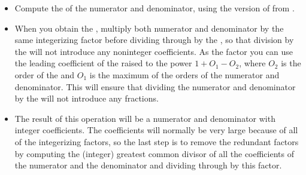 \begin{itemize}
\item
Compute the  of the numerator and denominator, using the version
of  from .

\item
When you obtain the , multiply both numerator and denominator by
the same integerizing factor before dividing through by the , so
that division by the  will not introduce any noninteger
coefficients.  As the factor you can use the leading coefficient of the
 raised to the power \( 1 + O_1 - O_2 \), where \( O_2 \) is the
order of the  and \( O_1 \) is the maximum of the orders of the
numerator and denominator.  This will ensure that dividing the numerator and
denominator by the  will not introduce any fractions.

\item
The result of this operation will be a numerator and denominator with integer
coefficients.  The coefficients will normally be very large because of all of
the integerizing factors, so the last step is to remove the redundant factors
by computing the (integer) greatest common divisor of all the coefficients of
the numerator and the denominator and dividing through by this factor.
\end{itemize}

